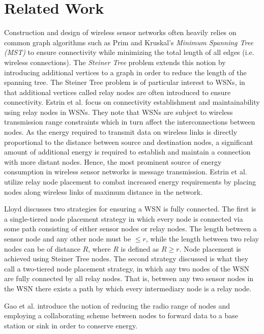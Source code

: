 \section{Related Work}\label{Related Work}

Construction and design of wireless sensor networks often heavily relies on common graph algorithms such as Prim and Kruskal's \textit{Minimum Spanning Tree (MST)}\cite{CLRS} to ensure connectivity while minimizing the total length of all edges (i.e. wireless connections). The \textit{Steiner Tree} problem extends this notion by introducing additional vertices to a graph in order to reduce the length of the spanning tree. The Steiner Tree problem is of particular interest to WSNs, in that additional vertices called relay nodes are often introduced to ensure connectivity. Estrin et al. \cite{940390} focus on connectivity establishment and maintainability using relay nodes in WSNs. They note that WSNs are subject to wireless transmission range constraints which in turn affect the interconnections between nodes. As the energy required to transmit data on wireless links is directly proportional to the distance between source and destination nodes, a significant amount of additional energy is required to establish and maintain a connection with more distant nodes. Hence, the most prominent source of energy consumption in wireless sensor networks is message transmission. Estrin et al. utilize relay node placement to combat increased energy requirements by placing nodes along wireless links of maximum distance in the network.

Lloyd \cite{1191701} discusses two strategies for ensuring a WSN is fully connected.  The first is a single-tiered node placement strategy in which every node is connected via some path consisting of either sensor nodes or relay nodes.  The length between a sensor node and any other node must be $ \leq r$, while the length between two relay nodes can be of distance $R$, where $R$ is defined as $R \geq r$.  Node placement is achieved using Steiner Tree nodes. The second strategy discussed is what they call a two-tiered node placement strategy, in which any two nodes of the WSN are fully connected by all relay nodes. That is, between any two sensor nodes in the WSN there exists a path by which every intermediary node is a relay node.

Gao et al. \cite{Gao200675} introduce the notion of reducing the radio range of nodes and employing a collaborating scheme between nodes to forward data to a base station or sink in order to conserve energy.

